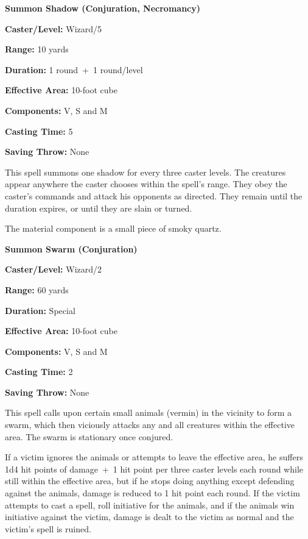 \begin{multicols}{2}
\begin{minipage}{\columnwidth}
\noindent \textbf{Summon Shadow (Conjuration, Necromancy)}

\noindent \textbf{Caster/Level:} Wizard/5

\noindent \textbf{Range:} 10 yards

\noindent \textbf{Duration:} 1 round~+~1 round/level

\noindent \textbf{Effective Area:} 10-foot cube

\noindent \textbf{Components:} V, S and M

\noindent \textbf{Casting Time:} 5

\noindent \textbf{Saving Throw:} None

\end{minipage}

This spell summons one shadow for every three caster levels.  The creatures appear anywhere the caster chooses within the spell's range.  They obey the caster's commands and attack his opponents as directed.  They remain until the duration expires, or until they are slain or turned.

The material component is a small piece of smoky quartz.

\vspace{1em}

\noindent
\begin{minipage}{\columnwidth}

\noindent \textbf{Summon Swarm (Conjuration)}

\noindent \textbf{Caster/Level:} Wizard/2

\noindent \textbf{Range:} 60 yards

\noindent \textbf{Duration:} Special

\noindent \textbf{Effective Area:} 10-foot cube

\noindent \textbf{Components:} V, S and M

\noindent \textbf{Casting Time:} 2

\noindent \textbf{Saving Throw:} None

\end{minipage}

This spell calls upon certain small animals (vermin) in the vicinity to form a swarm, which then viciously attacks any and all creatures within the effective area.  The swarm is stationary once conjured.

If a victim ignores the animals or attempts to leave the effective area, he suffers 1d4 hit points of damage~+~1 hit point per three caster levels each round while still within the effective area, but if he stops doing anything except defending against the animals, damage is reduced to 1 hit point each round.  If the victim attempts to cast a spell, roll initiative for the animals, and if the animals win initiative against the victim, damage is dealt to the victim as normal and the victim's spell is ruined.


\end{multicols}
